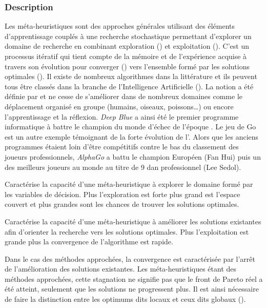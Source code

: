 \subsubsection{Description} %
\label{ssub:description_meta}
Les méta-heuristiques sont des approches générales utilisant des éléments d’apprentissage
couplés à une recherche stochastique permettant d’explorer un domaine de recherche en
combinant exploration () et exploitation
(). C’est un processus itératif qui tient compte de la
mémoire et de l’expérience acquise à travers son évolution pour converger
() vers l’ensemble formé par les solutions optimales
(). Il existe de nombreux algorithmes dans la littérature et
ils peuvent tous être classés dans la branche de l’Intelligence Artificielle (). La
notion a été définie par
 et ne cesse de s’améliorer dans de nombreux domaines comme le
déplacement organisé en groupe (humains, oiseaux, poissons\dots) ou encore l’apprentissage
et la réflexion. \textit{Deep Blue} a ainsi été le premier programme informatique à battre
le champion du monde d’échec de l’époque \parencite{Hsu199970}. Le jeu de Go est un autre
exemple témoignant de la forte évolution de l’. Alors que les anciens programmes étaient
loin d’être compétitifs contre le bas du classement des joueurs professionnels,
\textit{AlphaGo} \parencite{Silver2016484} a battu le champion Européen (Fan Hui) puis un
des meilleurs joueurs au monde au titre de 9 dan professionnel (Lee Sedol).

\begin{Def}[Exploration]\label{def:exploration}
Caractérise la capacité d’une méta-heuristique à explorer le domaine formé par les
variables de décision. Plus l’exploration est forte plus grand est l’espace couvert
et plus grandes sont les chances de trouver les solutions optimales.
\end{Def}

\begin{Def}[Exploitation]\label{def:exploitation}
Caractérise la capacité d’une méta-heuristique à améliorer les solutions existantes
afin d’orienter la recherche vers les solutions optimales. Plus l’exploitation est
grande plus la convergence de l’algorithme est rapide.
\end{Def}

\begin{Def}[Convergence]\label{def:convergence}
Dans le cas des méthodes approchées, la convergence est caractérisée par l’arrêt
de l’amélioration des solutions existantes. Les méta-heuristiques étant des
méthodes approchées, cette stagnation ne signifie pas que le front de Pareto réel
a été atteint, seulement que les solutions ne progressent plus. Il est ainsi
nécessaire de faire la distinction entre les optimums dits locaux et ceux dits
globaux ().
\end{Def}


